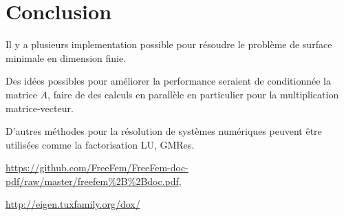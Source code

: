 \documentclass[a4paper, 11pt]{article}
\begin{document}
\newpage

\section{Conclusion}
Il y a plusieurs implementation possible pour r\'esoudre le probl\`eme de
 surface minimale en dimension finie.

Des id\'ees possibles pour am\'eliorer la performance seraient de conditionn\'ee
 la matrice $A$, faire de des calculs en parall\`ele en particulier pour la
 multiplication matrice-vecteur.

D'autres m\'ethodes pour la r\'esolution de syst\`emes num\'eriques peuvent
 \^etre utilis\'ees comme la factorisation LU, GMRes.

\newpage

\begin{thebibliography}{9}


  \url{https://github.com/FreeFem/FreeFem-doc-pdf/raw/master/freefem\%2B\%2Bdoc.pdf},

  \url{http://eigen.tuxfamily.org/dox/}
\end{thebibliography}
\end{document}
